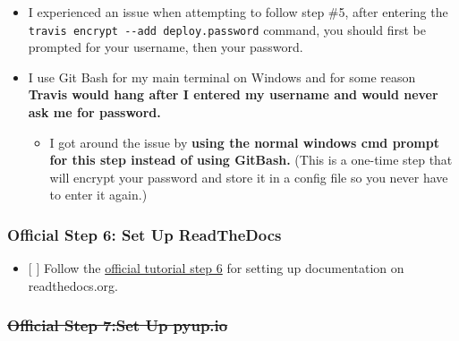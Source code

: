 \documentclass[11pt]{article}
\providecommand{\tightlist}{%
      \setlength{\itemsep}{0pt}\setlength{\parskip}{0pt}}
\begin{document}
\begin{itemize}
\begin{itemize}
    \begin{itemize}
    \tightlist
    \item
      I experienced an issue when attempting to follow step \#5, after
      entering the \texttt{travis\ encrypt\ -\/-add\ deploy.password}
      command, you should first be prompted for your username, then your
      password.
    \item
      I use Git Bash for my main terminal on Windows and for some reason
      \textbf{Travis would hang after I entered my username and would
      never ask me for password.}

      \begin{itemize}
      \tightlist
      \item
        I got around the issue by \textbf{using the normal windows cmd
        prompt for this step instead of using GitBash.} (This is a
        one-time step that will encrypt your password and store it in a
        config file so you never have to enter it again.)
      \end{itemize}
    \end{itemize}
  \end{itemize}
\end{itemize}

\hypertarget{official-step-6-set-up-readthedocs}{%
\subsubsection{Official Step 6: Set Up
ReadTheDocs}\label{official-step-6-set-up-readthedocs}}

\begin{itemize}
\tightlist
\item
  {[} {]} Follow the
  \href{https://cookiecutter-pypackage.readthedocs.io/en/latest/tutorial.html\#step-6-set-up-readthedocs}{official
  tutorial step 6} for setting up documentation on readthedocs.org.
\end{itemize}

\hypertarget{official-step-7set-up-pyup.io}{%
\subsubsection{\texorpdfstring{\sout{Official Step 7:Set Up
pyup.io}}{Official Step 7:Set Up pyup.io}}\label{official-step-7set-up-pyup.io}}
\end{document}
